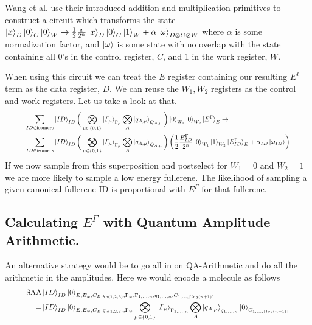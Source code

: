 \documentclass{article}
\begin{document}
\vspace{\baselineskip}
Wang et al. use their introduced addition and multiplication primitives to construct a circuit which transforms the state $\ket{x}_D\ket{0}_C\ket{0}_W \to \frac{1}{2}\frac{x}{2^n}\ket{x}_D\ket{0}_C\ket{1}_W+\alpha\ket{\omega}_{D \otimes C\otimes W}$ where $\alpha$ is some normalization factor, and $\ket{\omega}$ is some state with no overlap with the state containing all 0's in the control register, $C$, and 1 in the work register, $W$.


\vspace{\baselineskip}
When using this circuit we can treat the $E$ register containing our resulting $E^\Gamma$ term as the data register, $D$. We can reuse the $W_1,W_2$ registers as the control and work registers. Let us take a look at that.
\begin{equation}
   \resizebox{.9\hsize}{!}{$\begin{split}
       \sum_{ID\in \text{isomers}}&\ket{ID}_{ID}\bigg(\bigotimes_{\mu\in \{0,1\}}\ket{\varGamma_\mu}_{\Gamma_\mu}\bigotimes_{A}\ket{q_{A,\mu}}_{Q_{A,\mu}}\bigg)\ket{0}_{W_1}\ket{0}_{W_2}\ket{E^\Gamma}_E \to\\ 
       \sum_{ID\in \text{isomers}}&\ket{ID}_{ID}\bigg(\bigotimes_{\mu\in \{0,1\}}\ket{\varGamma_\mu}_{\Gamma_\mu}\bigotimes_{A}\ket{q_{A,\mu}}_{Q_{A,\mu}}\bigg)\left(\frac{1}{2}\frac{E^\Gamma_{ID}}{2^n}\ket{0}_{W_1}\ket{1}_{W_2}\ket{E^\Gamma_{ID}}_E+\alpha_{ID}\ket{\omega_{ID}}\right) \\ 
   \end{split}$}
\end{equation}
If we now sample from this superposition and postselect for $W_1 = 0$ and $W_2 = 1$ we are more likely to sample a low energy fullerene. The likelihood of sampling a given canonical fullerene ID is proportional with $E^\Gamma$ for that fullerene.



\subsection{Calculating $E^\Gamma$ with Quantum Amplitude Arithmetic.}
An alternative strategy would be to go all in on QA-Arithmetic and do all the arithmetic in the amplitudes. 
Here we would encode a molecule as follows
\begin{equation}
   \resizebox{.9\hsize}{!}{$\begin{split}
       \text{SAA}&\ket{ID}_{ID}\ket{0}_{E,E_w,C_E,q_{o(1,2,3)},\Gamma_w,\Gamma_{1,\dots,n},q_{1,\dots,n},C_{1,\dots,\lceil log(n+1) \rceil}}\\
       =&\ket{ID}_{ID}\ket{0}_{E,E_w,C_E,q_{o(1,2,3)},\Gamma_w}\bigotimes_{\mu\in\{0,1\}}\ket{\varGamma_\mu}_{\Gamma_{1,\dots,n}}\bigotimes_{A}\ket{q_{A,\mu}}_{q_{1,\dots,n}}\ket{0}_{C_{1,\dots,\lceil log(n+1) \rceil}}
   \end{split}$}
\end{equation}
\end{document}
